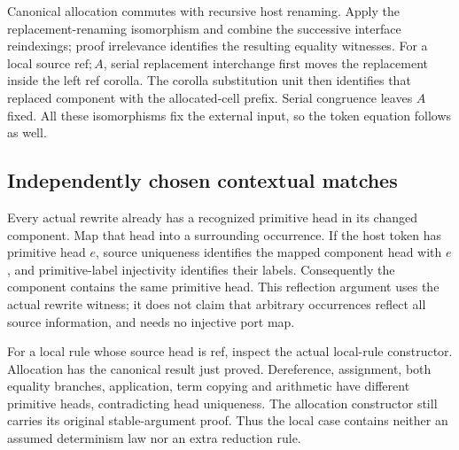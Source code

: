

Canonical allocation commutes with recursive host renaming. Apply the
replacement-renaming isomorphism and combine the successive interface
reindexings; proof irrelevance identifies the resulting equality witnesses.
For a local source $\mathrm{ref};A$, serial replacement interchange first moves
the replacement inside the left ref corolla. The corolla substitution unit
then identifies that replaced component with the allocated-cell prefix.
Serial congruence leaves $A$ fixed. All these isomorphisms fix the external
input, so the token equation follows as well.



\subsection{Independently chosen contextual matches}

Every actual rewrite already has a recognized primitive head in its changed
component. Map that head into a surrounding occurrence. If the host token
has primitive head $e$, source uniqueness identifies the mapped component
head with $e$, and primitive-label injectivity identifies their labels.
Consequently the component contains the same primitive head. This reflection
argument uses the actual rewrite witness; it does not claim that arbitrary
occurrences reflect all source information, and needs no injective port map.


For a local rule whose source head is ref, inspect the actual local-rule
constructor. Allocation has the canonical result just proved. Dereference,
assignment, both equality branches, application, term copying and arithmetic
have different primitive heads, contradicting head uniqueness. The allocation
constructor still carries its original stable-argument proof. Thus the local
case contains neither an assumed determinism law nor an extra reduction rule.


